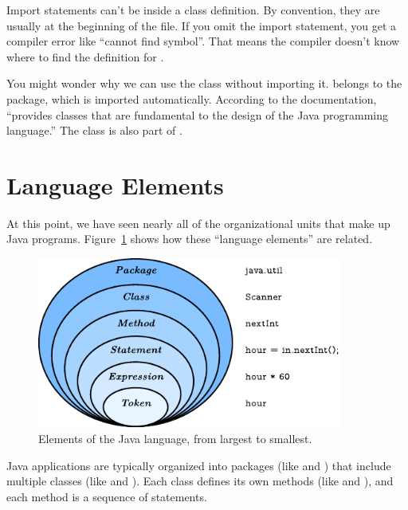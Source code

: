 Import statements can't be inside a class definition.
By convention, they are usually at the beginning of the file.
If you omit the import statement, you get a compiler error like ``cannot find symbol''.
That means the compiler doesn't know where to find the definition for .


You might wonder why we can use the  class without importing it.
 belongs to the  package, which is imported automatically.
According to the documentation,  ``provides classes that are fundamental to the design of the Java programming language.''
The  class is also part of .


\section{Language Elements}


At this point, we have seen nearly all of the organizational units that make up Java programs.
Figure~\ref{fig.package} shows how these ``language elements'' are related.

\begin{figure}[!ht]
\begin{center}
\includegraphics[width=3.95in]{figs/package.pdf}
\caption{Elements of the Java language, from largest to smallest.}
\label{fig.package}
\end{center}
\end{figure}


Java applications are typically organized into packages (like  and ) that include multiple classes (like  and ).
Each class defines its own methods (like  and ), and each method is a sequence of statements.

